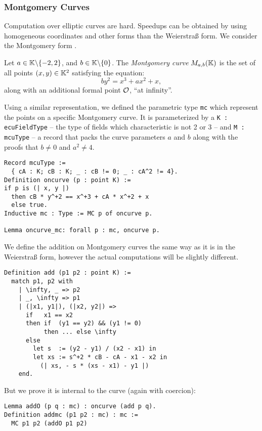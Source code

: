 \subsubsection{Montgomery Curves}
\label{montgomery}
Computation over elliptic curves are hard. Speedups can be obtained by using
homogeneous coordinates and other forms than the Weierstra{\ss} form. We consider
the Montgomery form \cite{MontgomerySpeeding}.

\begin{definition}
  Let $a \in \mathbb{K} \backslash \{-2, 2\}$, and $b \in \mathbb{K} \backslash \{ 0\}$.
  The \textit{Montgomery curve} $M_{a,b}(\mathbb{K})$ is the set of all points $(x,y) \in \mathbb{K}^2$ satisfying the equation:
  $$by^2 = x^3 + ax^2 + x,$$
  along with an additional formal point $\mathcal{O}$, ``at infinity''.
\end{definition}
Using a similar representation, we defined the parametric type \texttt{mc} which
represent the points on a specific Montgomery curve. It is parameterized by
a \texttt{K : ecuFieldType} -- the type of fields which characteristic is not 2 or 3 --
and \texttt{M : mcuType} -- a record that packs the curve parameters $a$ and $b$
along with the proofs that $b \neq 0$ and $a^2 \neq 4$.
\begin{lstlisting}[language=Coq]
Record mcuType :=
  { cA : K; cB : K; _ : cB != 0; _ : cA^2 != 4}.
Definition oncurve (p : point K) :=
if p is (| x, y |)
  then cB * y^+2 == x^+3 + cA * x^+2 + x
  else true.
Inductive mc : Type := MC p of oncurve p.

Lemma oncurve_mc: forall p : mc, oncurve p.
\end{lstlisting}
We define the addition on Montgomery curves the same way as it is in the Weierstra{\ss} form,
however the actual computations will be slightly different.
\begin{lstlisting}[language=Coq]
Definition add (p1 p2 : point K) :=
  match p1, p2 with
    | \infty, _ => p2
    | _, \infty => p1
    | (|x1, y1|), (|x2, y2|) =>
      if   x1 == x2
      then if  (y1 == y2) && (y1 != 0)
           then ... else \infty
      else
        let s  := (y2 - y1) / (x2 - x1) in
        let xs := s^+2 * cB - cA - x1 - x2 in
          (| xs, - s * (xs - x1) - y1 |)
    end.
\end{lstlisting}
But we prove it is internal to the curve (again with coercion):
\begin{lstlisting}[language=Coq]
Lemma addO (p q : mc) : oncurve (add p q).
Definition addmc (p1 p2 : mc) : mc :=
  MC p1 p2 (addO p1 p2)
\end{lstlisting}

